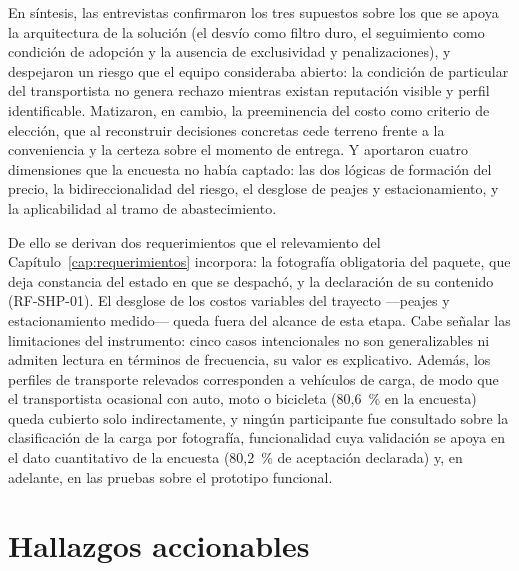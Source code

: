 {En síntesis, las entrevistas confirmaron los tres supuestos sobre los que se apoya la arquitectura de la solución (el desvío como filtro duro, el seguimiento como condición de adopción y la ausencia de exclusividad y penalizaciones), y despejaron un riesgo que el equipo consideraba abierto: la condición de particular del transportista no genera rechazo mientras existan reputación visible y perfil identificable. Matizaron, en cambio, la preeminencia del costo como criterio de elección, que al reconstruir decisiones concretas cede terreno frente a la conveniencia y la certeza sobre el momento de entrega. Y aportaron cuatro dimensiones que la encuesta no había captado: las dos lógicas de formación del precio, la bidireccionalidad del riesgo, el desglose de peajes y estacionamiento, y la aplicabilidad al tramo de abastecimiento.

De ello se derivan dos requerimientos que el relevamiento del Capítulo~\ref{cap:requerimientos} incorpora: la fotografía obligatoria del paquete, que deja constancia del estado en que se despachó, y la declaración de su contenido (RF-SHP-01). El desglose de los costos variables del trayecto —peajes y estacionamiento medido— queda fuera del alcance de esta etapa. Cabe señalar las limitaciones del instrumento: cinco casos intencionales no son generalizables ni admiten lectura en términos de frecuencia, su valor es explicativo. Además, los perfiles de transporte relevados corresponden a vehículos de carga, de modo que el transportista ocasional con auto, moto o bicicleta (80,6~\% en la encuesta) queda cubierto solo indirectamente, y ningún participante fue consultado sobre la clasificación de la carga por fotografía, funcionalidad cuya validación se apoya en el dato cuantitativo de la encuesta (80,2~\% de aceptación declarada) y, en adelante, en las pruebas sobre el prototipo funcional.
}

\section{Hallazgos accionables}

